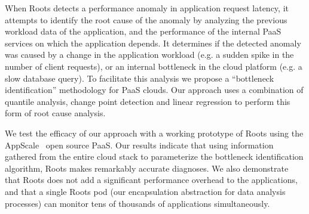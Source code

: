 
When Roots detects a performance anomaly in application request latency, 
it attempts to
identify the root cause of the anomaly by analyzing the previous workload 
data of the application,
and the performance of the internal PaaS services on which the application depends.
It determines if the detected anomaly was caused by a change in the
application workload (e.g. a sudden spike in the number of client requests), or an internal
bottleneck in the cloud platform (e.g. a slow database query). To facilitate
this analysis we propose a ``bottleneck identification'' methodology
for PaaS clouds. 
Our approach uses a combination of quantile analysis, change point detection
and linear regression to perform this form of root cause analysis. 

We test the efficacy of our approach with a working prototype of 
Roots using the AppScale~\cite{6488671} open source PaaS. 
Our results indicate that using information gathered from the entire cloud
stack to parameterize the bottleneck identification algorithm, Roots
makes remarkably accurate diagnoses.
We also demonstrate that Roots does not add a significant performance overhead
to the applications, and that a single Roots pod (our encapsulation abstraction for
data analysis processes) can monitor tens of thousands
of applications simultaneously.


